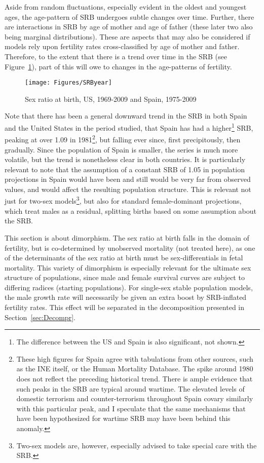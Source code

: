 Aside from random fluctuations, especially evident in the oldest and youngest
ages, the age-pattern of SRB undergoes subtle changes over time. Further, there
are interactions in SRB by age of mother and age of father (these later two
also being marginal distributions). These are aspects that may also be
considered if models rely upon fertility rates cross-classified by age of mother
and father. Therefore, to the extent that there is a trend over time in the SRB
(see Figure~\ref{fig:SRByears}), part of this will owe to changes in the
age-patterns of fertility.

\begin{figure}[ht!]
        \centering  
          \caption{Sex ratio at birth, US, 1969-2009 and Spain,
          1975-2009}
           \texttt{[image: Figures/SRByear]}
          \label{fig:SRByears}
\end{figure}

Note that there has been a general downward trend in the SRB in both Spain and
the United States in the period studied, that Spain has had a
higher\footnote{The difference between the US and Spain is also significant, not
shown.} SRB, peaking at over 1.09 in 1981\footnote{These high figures for
Spain agree with tabulations from other sources, such as the INE itself, or the
Human Mortality Database. The spike around 1980 does not reflect the
preceding historical trend. There is ample evidence that such peaks in the SRB
are typical around wartime\citep{james2009variations}. The elevated levels of
domestic terrorism and counter-terrorism throughout Spain covary similarly with
this particular peak, and I speculate that the same mechanisms
that have been hypothesized for wartime SRB may have been behind this anomaly.}, but falling ever since,
first precipitously, then gradually. Since the population of Spain is smaller, the series 
is much more volatile, but the trend is nonetheless clear in both countries. It 
is particularly relevant to note that the assumption of a constant SRB of 1.05 in
 population projections in Spain would have been and still would be very far from 
 observed values, and would affect the resulting population structure. This is 
 relevant not just for two-sex models\footnote{Two-sex models are, however, especially 
 advised to take special care with the SRB.}, but also for standard female-dominant 
 projections, which treat males as a residual, splitting births based on some
assumption about the SRB.

This section is about dimorphism. The sex ratio at birth
falls in the domain of fertility, but is co-determined by unobserved mortality
(not treated here), as one of the determinants of the sex ratio at birth must be
sex-differentials in fetal mortality\citep{hassold1983sex}. This variety of
dimorphism is especially relevant for the ultimate sex structure of populations, since 
male and female survival curves are subject 
to differing radices (starting populations). For single-sex stable population
models, the male growth rate will necessarily be given an extra boost by SRB-inflated fertility
rates. This effect will be separated in the decomposition presented in
Section~\ref{sec:Decompr}.
